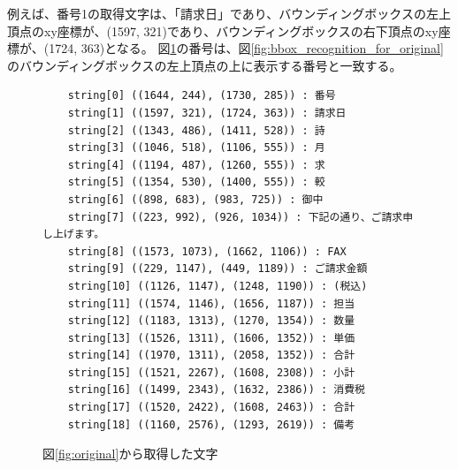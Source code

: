 例えば、番号1の取得文字は、「請求日」であり、バウンディングボックスの左上頂点のxy座標が、(1597, 321)であり、バウンディングボックスの右下頂点のxy座標が、(1724, 363)となる。
図\ref{fig:char_recognition_for_original}の番号は、図\ref{fig:bbox_recognition_for_original}のバウンディングボックスの左上頂点の上に表示する番号と一致する。

\lstset{language=}
\begin{figure}[t]
    \begin{lstlisting}
    string[0] ((1644, 244), (1730, 285)) : 番号
    string[1] ((1597, 321), (1724, 363)) : 請求日
    string[2] ((1343, 486), (1411, 528)) : 詩
    string[3] ((1046, 518), (1106, 555)) : 月
    string[4] ((1194, 487), (1260, 555)) : 求
    string[5] ((1354, 530), (1400, 555)) : 較
    string[6] ((898, 683), (983, 725)) : 御中
    string[7] ((223, 992), (926, 1034)) : 下記の通り、ご請求申し上げます。
    string[8] ((1573, 1073), (1662, 1106)) : FAX
    string[9] ((229, 1147), (449, 1189)) : ご請求金額
    string[10] ((1126, 1147), (1248, 1190)) : (税込)
    string[11] ((1574, 1146), (1656, 1187)) : 担当
    string[12] ((1183, 1313), (1270, 1354)) : 数量
    string[13] ((1526, 1311), (1606, 1352)) : 単価
    string[14] ((1970, 1311), (2058, 1352)) : 合計
    string[15] ((1521, 2267), (1608, 2308)) : 小計
    string[16] ((1499, 2343), (1632, 2386)) : 消費税
    string[17] ((1520, 2422), (1608, 2463)) : 合計
    string[18] ((1160, 2576), (1293, 2619)) : 備考
    \end{lstlisting}
    \caption{図\ref{fig:original}から取得した文字}
    \label{fig:char_recognition_for_original}
\end{figure}

